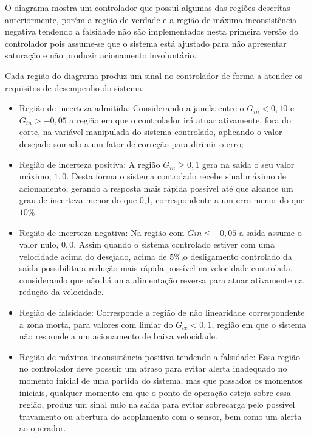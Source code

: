 O diagrama mostra um controlador que possui algumas das regiões descritas anteriormente,
porém a região de verdade e a região de máxima inconsistência negativa tendendo a falsidade
não são implementados nesta primeira versão do controlador
pois assume-se que o sistema está ajustado para não apresentar saturação
e não produzir acionamento involuntário.

Cada região do diagrama produz um sinal no controlador de forma a
atender os requisitos de desempenho do sistema:
\begin{itemize}

\item Região de incerteza admitida:
Considerando a janela entre o $G_{in} < 0,10$ e $G_{in} > -0,05$
a região em que o controlador irá atuar ativamente,
fora do corte, na variável manipulada do sistema controlado,
aplicando o valor desejado somado a um fator de correção para dirimir o erro;

\item Região de incerteza positiva:
A região $G_{in} \ge 0,1$ gera na saída o seu valor máximo, $1,0$.
Desta forma o sistema controlado recebe sinal máximo de
acionamento, gerando a resposta mais rápida possível até que alcance
um grau de incerteza menor do que 0,1, correspondente a um erro
menor do que $10\%$.

\item Região de incerteza negativa:
Na região com $Gin \le -0,05$ a saída assume o valor nulo, $0,0$.
Assim quando o sistema controlado estiver com
uma velocidade acima do desejado, acima de $5\%$,o desligamento
controlado da saída possibilita a redução mais rápida possível na
velocidade controlada, considerando que não há uma alimentação
reversa para atuar ativamente na redução da velocidade.

\item Região de falsidade:
Corresponde a região de não linearidade correspondente a zona morta,
para valores com limiar do $G_{ce} < 0,1$,
região em que o sistema não responde a um acionamento de baixa velocidade.

\item Região de máxima inconsistência positiva tendendo a falsidade:
Essa região no controlador deve possuir um atraso para evitar alerta inadequado
no momento inicial de uma partida do sistema,
mas que passados os momentos iniciais,
qualquer momento em que o ponto de operação esteja sobre essa região,
produz um sinal nulo na saída para evitar sobrecarga pelo possível travamento
ou abertura do acoplamento com o sensor,
bem como um alerta ao operador.

\end{itemize}



